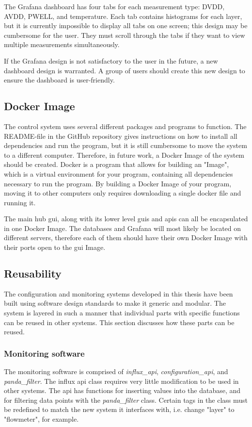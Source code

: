\documentclass[main.tex]{subfiles}
\begin{document}
The Grafana dashboard has four tabs for each measurement type: DVDD, AVDD, PWELL, and temperature. Each tab contains histograms for each layer, but it is currently impossible to display all tabs on one screen; this design may be cumbersome for the user. They must scroll through the tabs if they want to view multiple measurements simultaneously.

If the Grafana design is not satisfactory to the user in the future, a new dashboard design is warranted. A group of users should create this new design to ensure the dashboard is user-friendly.


 
 \subsection{Docker Image}
 
 The control system uses several different packages and programs to function. The README-file in the GitHub repository gives instructions on how to install all dependencies and run the program, but it is still cumbersome to move the system to a different computer. Therefore, in future work, a Docker Image of the system should be created. Docker is a program that allows for building an "Image", which is a virtual environment for your program, containing all dependencies necessary to run the program. By building a Docker Image of your program, moving it to other computers only requires downloading a single docker file and running it.
 
 The main hub \gls{gui}, along with its lower level \gls{gui}s and \gls{api}s can all be encapsulated in one Docker Image. The databases and Grafana will most likely be located on different servers, therefore each of them should have their own Docker Image with their ports open to the \gls{gui} Image.
 
 \subsection{Reusability}
 
 The configuration and monitoring systems developed in this thesis have been built using software design standards to make it generic and modular. The system is layered in such a manner that individual parts with specific functions can be reused in other systems. This section discusses how these parts can be reused.
 
 \subsubsection{Monitoring software}
The monitoring software is comprised of \textit{influx\_api}, \textit{configuration\_api}, and \textit{panda\_filter}. The influx api class requires very little modification to be used in other systems. The \gls{api} has functions for inserting values into the database, and for filtering data points with the \textit{panda\_filter} class. Certain tags in the class must be redefined to match the new system it interfaces with, i.e. change "layer" to "flowmeter", for example.
\end{document}
